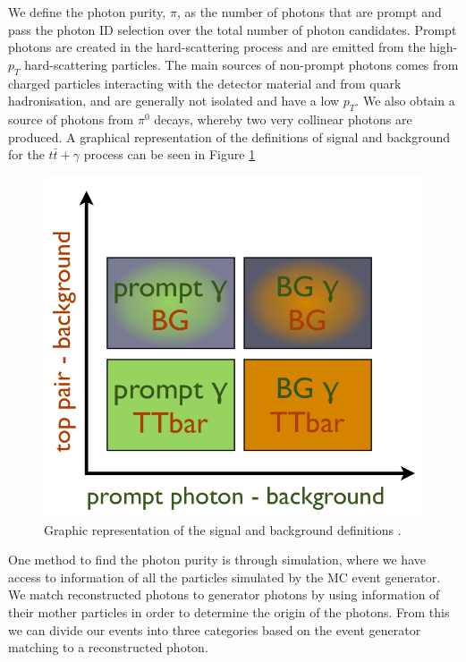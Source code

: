 We define the photon purity, $\pi$, as the number of photons that are prompt and pass the photon ID selection over the total number of photon candidates. Prompt photons are created in the hard-scattering process and are emitted from the high-$p_T$ hard-scattering particles. The main sources of non-prompt photons comes from charged particles interacting with the detector material and from quark hadronisation, and are generally not isolated and have a low $p_T$. We also obtain a source of photons from $\pi^0$ decays, whereby two very collinear photons are produced. A graphical representation of the definitions of signal and background for the $t\bar{t}+\gamma$ process can be seen in Figure \ref{fig-signalphotonplot}

\begin{figure} 
\begin{center}
\includegraphics[scale=0.33]{Figures/SignalPhotonPlot.png}
\end{center}
\caption{Graphic representation of the signal and background definitions \cite{MishaThesis}.}
\label{fig-signalphotonplot}
\end{figure} 

One method to find the photon purity is through simulation, where we have access to information of all the particles simulated by the MC event generator. We match reconstructed photons to generator photons by using information of their mother particles in order to determine the origin of the photons. From this we can divide our events into three categories based on the event generator matching to a reconstructed photon. 

